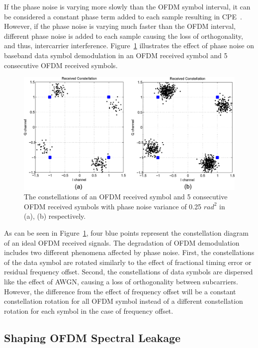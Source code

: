 If the phase noise is varying more slowly than the OFDM symbol interval, it can be considered a constant phase term added to each sample resulting in CPE~\cite{Armada1998}.
However, if the phase noise is varying much faster than the OFDM interval, different phase noise is added to each sample causing the loss of orthogonality, and thus, intercarrier interference.
Figure~\ref{fig:phasenoise} illustrates the effect of phase noise on baseband data symbol demodulation in an OFDM received symbol and 5 consecutive OFDM received symbols.
\begin{figure}
	\centerline{\includegraphics [width=0.8\columnwidth] {Figures/phasenoise.pdf} }
	\caption{The constellations of an OFDM received symbol and 5 consecutive OFDM received symbols with phase noise variance of 0.25 $rad^2$ in (a), (b) respectively.}
	\label{fig:phasenoise}
\end{figure}

As can be seen in Figure~\ref{fig:phasenoise}, four blue points represent the constellation diagram of an ideal OFDM received signals.
The degradation of OFDM demodulation includes two different phenomena affected by phase noise.
First, the constellations of the data symbol are rotated similarly to the effect of fractional timing error or residual frequency offset.
Second, the constellations of data symbols are dispersed like the effect of AWGN, causing a loss of orthogonality between subcarriers.
However, the difference from the effect of frequency offset will be a constant constellation rotation for all OFDM symbol instead of a different constellation rotation for each symbol in the case of frequency offset.


\subsection{Shaping OFDM Spectral Leakage}
\label{Ch2:SpecLeak}


